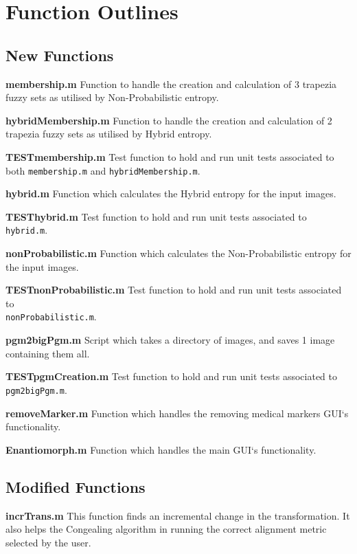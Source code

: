 \chapter{Function Outlines}
\label{appendix:code}

\section{New Functions}

\noindent \textbf{membership.m}
Function to handle the creation and calculation of 3 trapezia fuzzy sets as utilised by Non-Probabilistic entropy.

\noindent \textbf{hybridMembership.m}
Function to handle the creation and calculation of 2 trapezia fuzzy sets as utilised by Hybrid entropy.

\noindent \textbf{TESTmembership.m}
Test function to hold and run unit tests associated to both \texttt{membership.m} and \texttt{hybridMembership.m}.

\noindent \textbf{hybrid.m}
Function which calculates the Hybrid entropy for the input images.

\noindent \textbf{TESThybrid.m}
Test function to hold and run unit tests associated to \texttt{hybrid.m}.

\noindent \textbf{nonProbabilistic.m}
Function which calculates the Non-Probabilistic entropy for the input images.

\noindent \textbf{TESTnonProbabilistic.m}
Test function to hold and run unit tests associated to \\ \texttt{nonProbabilistic.m}.

\noindent \textbf{pgm2bigPgm.m}
Script which takes a directory of images, and saves 1 image containing them all.

\noindent \textbf{TESTpgmCreation.m}
Test function to hold and run unit tests associated to \texttt{pgm2bigPgm.m}.

\noindent \textbf{removeMarker.m}
Function which handles the removing medical markers \acrshort{GUI}`s functionality.

\noindent \textbf{Enantiomorph.m}
Function which handles the main \acrshort{GUI}`s functionality.

\section{Modified Functions}

\noindent \textbf{incrTrans.m}
This function finds an incremental change in the transformation. It also helps the \Gls{Congealing} algorithm in running the correct alignment metric selected by the user.

